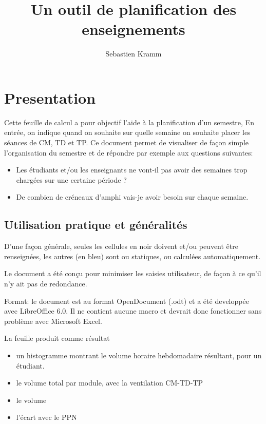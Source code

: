 \documentclass[12pt,a4paper]{article}
\author{Sebastien Kramm}
\title{Un outil de planification des enseignements}
\begin{document}
\maketitle

\section{Presentation}

Cette feuille de calcul a pour objectif l'aide à la planification d'un semestre, 
En entrée, on indique quand on souhaite sur quelle semaine on souhaite placer les séances de CM, TD et TP.
Ce document permet de visualiser de façon simple l'organisation du semestre et de répondre par exemple aux questions suivantes:

\begin{itemize}
\item Les étudiants et/ou les enseignants ne vont-il pas avoir des semaines trop chargées sur une certaine période ?
\item De combien de créneaux d'amphi vais-je avoir besoin sur chaque semaine.
\end{itemize}


\subsection{Utilisation pratique et généralités}


D'une façon générale, seules les cellules en noir doivent et/ou peuvent être renseignées, les autres (en bleu) sont ou statiques, ou calculées automatiquement.

Le document a été conçu pour minimiser les saisies utilisateur, de façon à ce qu'il n'y ait pas de redondance.

Format: le document est au format OpenDocument (.odt) et a été developpée avec LibreOffice 6.0.
Il ne contient aucune macro et devrait donc fonctionner sans problème avec Microsoft Excel.

La feuille produit comme résultat
\begin{itemize}
\item un histogramme montrant le volume horaire hebdomadaire résultant, pour un étudiant.
\item le volume total par module, avec la ventilation CM-TD-TP 
\item le volume
\item l'écart avec le PPN
\end{itemize}
\end{document}
